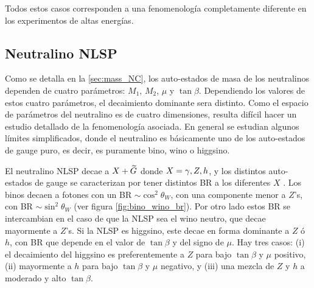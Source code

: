 




Todos estos casos corresponden a una fenomenología completamente diferente en
los experimentos de altas energías.


\subsection{Neutralino NLSP}

Como se detalla en la \cref{sec:mass_NC}, los auto-estados de masa de los
neutralinos dependen de cuatro parámetros: $M_1$, $M_2$, $\mu$ y $\tan\beta$.
Dependiendo los valores de estos cuatro parámetros, el decaimiento dominante
sera distinto. Como el espacio de parámetros del neutralino es de cuatro
dimensiones, resulta difícil hacer un estudio detallado de la fenomenología asociada.
En general se estudian algunos límites simplificados, donde el neutralino
es básicamente uno de los auto-estados de gauge puro, es decir, es puramente
bino, wino o higgsino.

El neutralino NLSP decae a $X + \widetilde{G}$ donde $X=\gamma,Z,h$, y los distintos
auto-estados de gauge se caracterizan por tener distintos BR a los diferentes $X$
\cite{Ruderman:2011vv}.
Los binos decaen a fotones con un BR $\sim \cos^2\theta_W$, con una componente
menor a $Z$'s, con BR $\sim \sin^2\theta_W$ (ver figura
\cref{fig:bino_wino_br}). Por otro lado estos BR se intercambian en el caso de
que la NLSP sea el wino neutro, que decae mayormente a $Z$'s. Si la NLSP es
higgsino, este decae en forma dominante a $Z$ ó $h$, con BR que depende en el
valor de $\tan\beta$ y del signo de $\mu$. Hay tres casos: (i) el decaimiento
del higgsino es preferentemente a $Z$ para bajo $\tan\beta$ y $\mu$ positivo,
(ii) mayormente a $h$ para bajo $\tan\beta$ y $\mu$ negativo, y (iii) una mezcla
de $Z$ y $h$ a moderado y alto $\tan\beta$.

